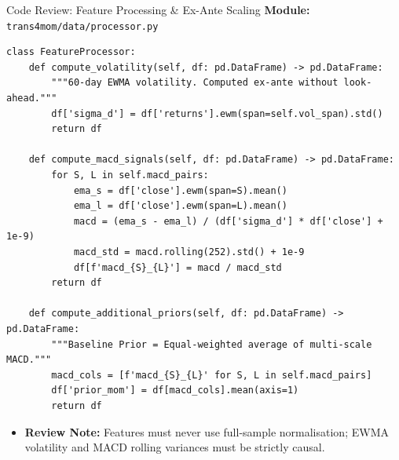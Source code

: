 \documentclass[10pt]{beamer}
\begin{document}
\begin{frame}[fragile]{Code Review: Feature Processing \& Ex-Ante Scaling}
  \textbf{\scriptsize Module:} \texttt{trans4mom/data/processor.py}
\begin{lstlisting}
class FeatureProcessor:
    def compute_volatility(self, df: pd.DataFrame) -> pd.DataFrame:
        """60-day EWMA volatility. Computed ex-ante without look-ahead."""
        df['sigma_d'] = df['returns'].ewm(span=self.vol_span).std()
        return df

    def compute_macd_signals(self, df: pd.DataFrame) -> pd.DataFrame:
        for S, L in self.macd_pairs:
            ema_s = df['close'].ewm(span=S).mean()
            ema_l = df['close'].ewm(span=L).mean()
            macd = (ema_s - ema_l) / (df['sigma_d'] * df['close'] + 1e-9)
            macd_std = macd.rolling(252).std() + 1e-9
            df[f'macd_{S}_{L}'] = macd / macd_std
        return df

    def compute_additional_priors(self, df: pd.DataFrame) -> pd.DataFrame:
        """Baseline Prior = Equal-weighted average of multi-scale MACD."""
        macd_cols = [f'macd_{S}_{L}' for S, L in self.macd_pairs]
        df['prior_mom'] = df[macd_cols].mean(axis=1)
        return df
\end{lstlisting}
  \begin{itemize}\tiny
    \item \textbf{Review Note:} Features must never use full-sample normalisation; EWMA volatility and MACD rolling variances must be strictly causal.
  \end{itemize}
\end{frame}
\end{document}
